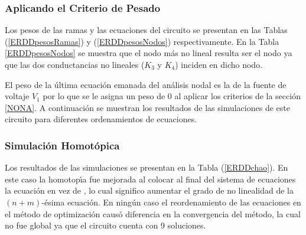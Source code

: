 \documentclass[conference,letterpaper,onecolumn]{IEEEtran}
\begin{document}
\subsubsection{Aplicando el Criterio de Pesado}

Los pesos de las ramas y las ecuaciones del circuito se presentan en
las Tablas (\ref{ERDDpesosRamas}) y (\ref{ERDDpesosNodos})
respectivamente. En la Tabla \ref{ERDDpesosNodos} se muestra que el nodo m\'as no lineal resulta ser el nodo  ya
que las dos conductancias no lineales ($K_3$ y $K_4$) inciden en dicho nodo.

\begin{table}[!h]
\caption{Pesos de las Funciones de Rama del Circuito ERDD}
\label{ERDDpesosRamas}
\end{table}

\begin{table}[!h]
\caption{Pesos de los nodos del circuito ERDD}
\label{ERDDpesosNodos}
\end{table}

El peso de la \'ultima ecuaci\'on emanada del an\'alisis nodal es la
de la fuente de voltaje $V_1$ por lo que se le asigna un peso de 0
al aplicar los criterios de la secci\'on \ref{NONA}.
A continuaci\'on se muestran los resultados
de las simulaciones de este circuito para diferentes
ordenamientos de ecuaciones.

\subsubsection{Simulaci\'on Homot\'opica}

Los resultados de las simulaciones se presentan en la Tabla (\ref{ERDDchao}).
En este caso la homotop\'{\i}a fue mejorada al colocar al final del
sistema de ecuaciones la ecuaci\'on  en vez de , lo
cual significo aumentar el grado de no linealidad de la $(n+m)$-\'esima
ecuaci\'on.
En ning\'un caso el reordenamiento de las ecuaciones en el m\'etodo de
optimizaci\'on caus\'o diferencia en la convergencia del m\'etodo, la
cual no fue global ya que el circuito cuenta con 9 soluciones.
\end{document}
